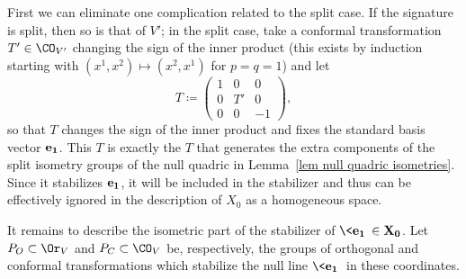 First we can eliminate one complication related to the split case. If the signature is split, then so is that of $V'$; in the split case, take a conformal transformation $T'\in\CO_{V'}$ changing the sign of the inner product (this exists by induction starting with $(x^1,x^2)\mapsto (x^2,x^1)$ for $p=q=1$) and let 
\[T\coloneqq \begin{pmatrix}
    1 & 0 & 0\\
    0 & T' & 0\\
    0 & 0 & -1
\end{pmatrix},\]
so that $T$ changes the sign of the inner product and fixes the standard basis vector $\bf{e}_1$. This $T$ is exactly the $T$ that generates the extra components of the split isometry groups of the null quadric in Lemma~\ref{lem null quadric isometries}. Since it stabilizes $\bf{e}_1$, it will be included in the stabilizer and thus can be effectively ignored in the description of $X_0$ as a homogeneous space.

It remains to describe the isometric part of the stabilizer of $\<\bf{e}_1\>\in X_0$. Let $P_O\subset \Or_V$ and  $P_C\subset \CO_V$ be, respectively, the groups of orthogonal and conformal transformations which stabilize the null line $\<\bf{e}_1\>$ in these coordinates.

